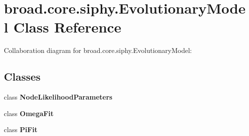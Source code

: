 \hypertarget{classbroad_1_1core_1_1siphy_1_1_evolutionary_model}{\section{broad.\+core.\+siphy.\+Evolutionary\+Model Class Reference}
\label{classbroad_1_1core_1_1siphy_1_1_evolutionary_model}
}


Collaboration diagram for broad.\+core.\+siphy.\+Evolutionary\+Model\+:
\subsection*{Classes}
\begin{DoxyCompactItemize}
\item 
class {\bfseries Node\+Likelihood\+Parameters}
\item 
class {\bfseries Omega\+Fit}
\item 
class {\bfseries Pi\+Fit}
\end{DoxyCompactItemize}
